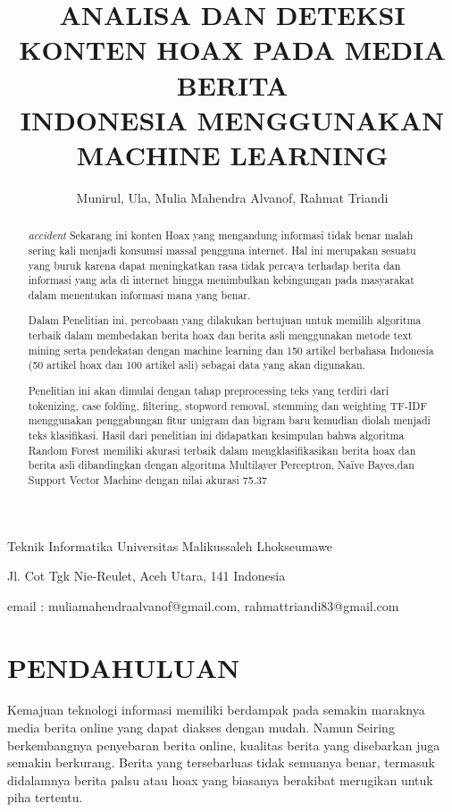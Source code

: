 \documentclass{article}
\begin{document}
\title{ANALISA DAN DETEKSI KONTEN HOAX PADA MEDIA BERITA\\ INDONESIA MENGGUNAKAN MACHINE LEARNING}
\author{Munirul, Ula, Mulia Mahendra Alvanof, Rahmat Triandi}
\maketitle
\begin{center}
Teknik Informatika Universitas Malikussaleh Lhokseumawe

Jl. Cot Tgk Nie-Reulet, Aceh Utara, 141 Indonesia

email : muliamahendraalvanof@gmail.com, rahmattriandi83@gmail.com
\end{center}
\begin{abstract}
\emph{accident}
Sekarang ini konten Hoax yang mengandung informasi tidak benar malah sering kali 
menjadi konsumsi massal pengguna internet. Hal ini merupakan sesuatu yang buruk 
karena dapat meningkatkan rasa tidak percaya terhadap berita dan informasi yang 
ada di internet hingga menimbulkan kebingungan pada masyarakat dalam menentukan 
informasi mana yang benar. 

Dalam Penelitian ini, percobaan yang dilakukan bertujuan untuk memilih algoritma 
terbaik dalam membedakan berita hoax dan berita asli menggunakan metode text 
mining serta pendekatan dengan machine learning dan 150 artikel berbahasa 
Indonesia (50 artikel hoax dan 100 artikel asli) sebagai data yang akan digunakan.

Penelitian ini akan dimulai dengan tahap preprocessing teks yang terdiri dari 
tokenizing, case folding, filtering, stopword removal, stemming dan weighting TF-IDF 
menggunakan penggabungan fitur unigram dan bigram baru kemudian diolah menjadi 
teks klasifikasi. Hasil dari penelitian ini didapatkan kesimpulan bahwa algoritma 
Random Forest memiliki akurasi terbaik dalam mengklasifikasikan berita hoax dan 
berita asli dibandingkan dengan algoritma Multilayer Perceptron, Naïve Bayes,dan 
Support Vector Machine dengan nilai akurasi 75.37%

\end{abstract}
\section{PENDAHULUAN}
Kemajuan teknologi informasi memiliki berdampak pada semakin maraknya media 
berita online yang dapat diakses dengan mudah. Namun Seiring berkembangnya 
penyebaran berita online, kualitas berita yang disebarkan juga semakin berkurang. 
Berita yang tersebarluas tidak semuanya benar, termasuk didalamnya berita palsu atau 
hoax yang biasanya berakibat merugikan untuk piha tertentu.
\end{document}
